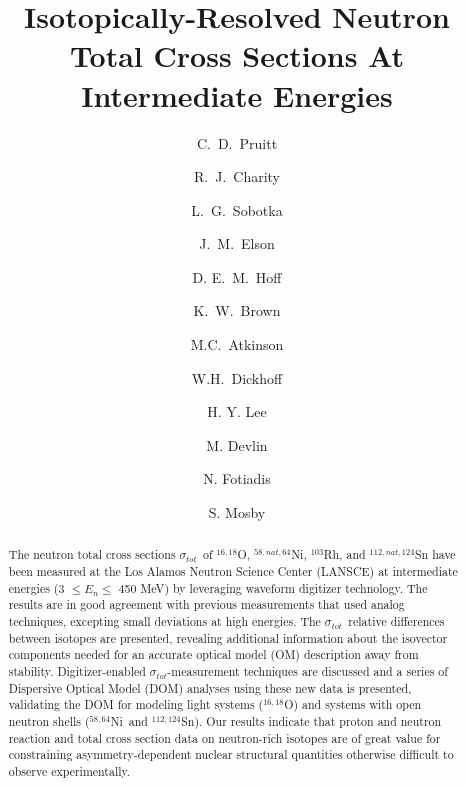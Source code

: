\documentclass[twocolumn,secnumarabic,amssymb, nobibnotes, aps, prl,
superscriptaddress, nobalancelastpage]{revtex4}
\newcommand{\tot}{\ensuremath{\sigma_{tot}}}
\newcommand{\oSixEight}{\ensuremath{^{16,18}}O}
\newcommand{\niEightFour}{\ensuremath{^{58,64}}N\lowercase{i}}
\newcommand{\snTwelveFour}{\ensuremath{^{112,124}}S\lowercase{n}}
\begin{document}
\begin{abstract}
    The neutron total cross sections \tot\ of $^{16,18}$O,
    $^{58,nat,64}$Ni, $^{103}$Rh, and $^{112,nat,124}$Sn have been measured at the Los Alamos
    Neutron Science Center (LANSCE) at intermediate energies (3 $\leq E_{n}
    \leq$ 450 MeV) by
    leveraging waveform digitizer technology. The results are in good agreement
    with previous measurements that used analog techniques,
    excepting small deviations at high energies.
    The \tot\ relative differences between isotopes are presented,
    revealing additional information about
    the isovector components needed for an accurate optical model (OM)
    description away from stability. Digitizer-enabled \tot-measurement
    techniques are discussed and a series of Dispersive Optical Model (DOM)
    analyses using these new data is presented, validating the DOM for modeling light
    systems (\oSixEight) and systems with open neutron shells (\niEightFour\ and \snTwelveFour).
    Our results indicate that proton and neutron reaction and total cross
    section data on neutron-rich isotopes are of great value for constraining
    asymmetry-dependent nuclear structural quantities otherwise difficult
    to observe experimentally.
\end{abstract}

\title{Isotopically-Resolved Neutron Total Cross Sections At
Intermediate Energies}

\author{C.~D.~Pruitt}  
\author{R.~J.~Charity}
\author{L.~G.~Sobotka}
\author{J.~M.~Elson}
\author{D. E.~M.~Hoff}  
\author{K.~W.~Brown} 

\author{M.C.~Atkinson}
\author{W.H.~Dickhoff}

\author{H. Y. Lee}
\author{M. Devlin}
\author{N. Fotiadis}
\author{S. Mosby}
\maketitle
\end{document}
